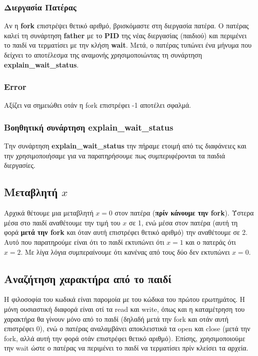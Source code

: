 \documentclass[12pt]{article}
\begin{document}
\subsubsection{Διεργασία Πατέρας}
Αν η \textbf{\foreignlanguage{english}{fork}} επιστρέψει θετικό αριθμό,
βρισκόμαστε στη διεργασία πατέρα.
Ο πατέρας καλεί τη συνάρτηση \textbf{\foreignlanguage{english}{father}} με το
\textbf{\foreignlanguage{english}{PID}} της νέας διεργασίας (παιδιού)
και περιμένει το παιδί να τερματίσει με την κλήση
\textbf{\foreignlanguage{english}{wait}}. Μετά, ο πατέρας τυπώνει ένα μήνυμα
που δείχνει το αποτέλεσμα της αναμονής
χρησιμοποιώντας τη συνάρτηση
\textbf{\foreignlanguage{english}{explain\_wait\_status}}.

\subsubsection{\foreignlanguage{english}{Error}}
Αξίζει να σημειώθει οτάν η \foreignlanguage{english}{fork} επιστρέφει -1
αποτέλει σφαλμά.

\subsubsection{Βοηθητική συνάρτηση
    \foreignlanguage{english}{explain\_wait\_status}}
Την συνάρτηση \textbf{\foreignlanguage{english}{explain\_wait\_status}} την
πήραμε ετοιμή από τις διαφάνειες και την χρησιμοποιήσαμε για να παρατηρήσουμε
πως συμπεριφέρονται τα παιδιά διεργασίες.

\pagebreak

\subsection{Μεταβλητή $x$}
Αρχικά θέτουμε μια μεταβλητή $x=0$ στον πατέρα (\textbf{πρίν κάνουμε την
    \foreignlanguage{english}{fork}}).
Ύστερα μέσα στο παιδί αναθέτουμε την τιμή του $x$ σε 1, ενώ μέσα στον πατέρα
(αυτή τη φορά \textbf{μετά την \foreignlanguage{english}{fork}} και όταν αυτή
επιστρέφει θετικό αριθμό) την αναθέτουμε σε 2. Αυτό που παρατηρούμε είναι ότι
το παιδί
εκτυπώνει ότι $x=1$ και ο πατεράς ότι $x=2$.
Με λίγα λόγια συμπεραίνουμε ότι κανένας από τους δύο δεν εκτυπώνει $x=0$.

\subsection{Αναζήτηση χαρακτήρα από το παιδί}
Η φιλοσοφία του κωδικά είναι παρομοία με του κώδικα του πρώτου ερωτημάτος. Η
μόνη ουσιαστική
διαφορά είναι οτί τα \foreignlanguage{english}{read} και
\foreignlanguage{english}{write}, όπως και
η καταμέτρηση του χαρακτήρα θα γίνουν μόνο από το παιδί (δηλαδή μετά την
\foreignlanguage{english}{fork}
και οτάν αυτή επιστρέφει 0), ενώ ο πατέρας αναλαμβάνει αποκλειστικά τα
\foreignlanguage{english}{open} και
\foreignlanguage{english}{close} (μετά την \foreignlanguage{english}{fork},
αλλά αυτή την φορά οτάν επιστρέφει θετικό αριθμό).
Επίσης, χρησιμοποιούμε την \foreignlanguage{english}{wait} ώστε ο πατέρας να
περιμένει το παιδί να τερματίσει
πρίν κλείσει τα αρχεία.
\end{document}
